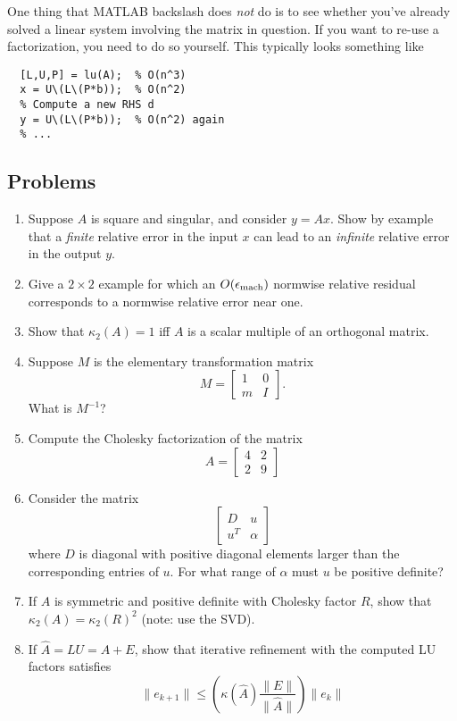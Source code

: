 \documentclass[12pt, leqno]{article}
\begin{document}
One thing that MATLAB backslash does {\em not} do is to see whether
you've already solved a linear system involving the matrix in
question.  If you want to re-use a factorization, you need to do so
yourself.  This typically looks something like
\begin{lstlisting}
  [L,U,P] = lu(A);  % O(n^3)
  x = U\(L\(P*b));  % O(n^2)
  % Compute a new RHS d
  y = U\(L\(P*b));  % O(n^2) again
  % ...
\end{lstlisting}

\subsection{Problems}

\begin{enumerate}
\item
  Suppose $A$ is square and singular, and consider $y = Ax$.
  Show by example that a {\em finite} relative error in the input
  $x$ can lead to an {\em infinite} relative error in the output $y$.
\item
  Give a $2 \times 2$ example for which an $O(\epsilon_{\mathrm{mach}})$ normwise
  relative residual corresponds to a normwise relative error near one.
\item
  Show that $\kappa_2(A) = 1$ iff $A$ is a scalar multiple of an
  orthogonal matrix.
\item
  Suppose $M$ is the elementary transformation matrix
  \[
    M = \begin{bmatrix} 1 & 0 \\ m & I \end{bmatrix}.
  \]
  What is $M^{-1}$?
\item
  Compute the Cholesky factorization of the matrix
  \[
  A = \begin{bmatrix}
         4 & 2 \\
         2 & 9
      \end{bmatrix}
  \]
\item
  Consider the matrix
  \[
  \begin{bmatrix}
    D & u \\
    u^T & \alpha
  \end{bmatrix}
  \]
  where $D$ is diagonal with positive diagonal elements larger than the
  corresponding entries of $u$.  For what range of $\alpha$ must
  $u$ be positive definite?
\item
  If $A$ is symmetric and positive definite with Cholesky factor $R$,
  show that $\kappa_2(A) = \kappa_2(R)^2$ (note: use the SVD).
\item
  If $\hat{A} = LU = A+E$, show that iterative refinement with
  the computed LU factors satisfies
  \[
    \|e_{k+1}\| \leq
    \left( \kappa(\hat{A}) \frac{\|E\|}{\|\hat{A}\|} \right) \|e_k\|
  \]
\end{enumerate}
\end{document}
